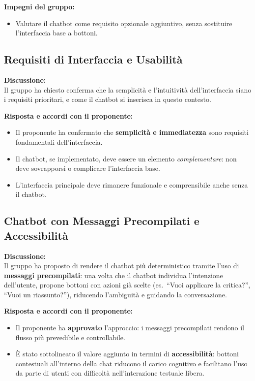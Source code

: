 \vspace{0.1cm}
\textbf{Impegni del gruppo:}
\begin{itemize}[leftmargin=1.5em, itemsep=3pt]
    \item Valutare il chatbot come requisito opzionale aggiuntivo, senza sostituire l'interfaccia base a bottoni.
\end{itemize}

\vspace{0.4cm}

\subsection{Requisiti di Interfaccia e Usabilità}

\textbf{Discussione:}\\
Il gruppo ha chiesto conferma che la semplicità e l'intuitività dell'interfaccia siano i requisiti prioritari, e come il chatbot si inserisca in questo contesto.

\vspace{0.3cm}
\textbf{Risposta e accordi con il proponente:}
\begin{itemize}[leftmargin=1.5em, itemsep=3pt]
    \item Il proponente ha confermato che \textbf{semplicità e immediatezza} sono requisiti fondamentali dell'interfaccia.
    \item Il chatbot, se implementato, deve essere un elemento \textit{complementare}: non deve sovrapporsi o complicare l'interfaccia base.
    \item L'interfaccia principale deve rimanere funzionale e comprensibile anche senza il chatbot.
\end{itemize}

\vspace{0.4cm}

\subsection{Chatbot con Messaggi Precompilati e Accessibilità}

\textbf{Discussione:}\\
Il gruppo ha proposto di rendere il chatbot più deterministico tramite l'uso di \textbf{messaggi precompilati}: una volta che il chatbot individua l'intenzione dell'utente, propone bottoni con azioni già scelte (es.\ ``Vuoi applicare la critica?'', ``Vuoi un riassunto?''), riducendo l'ambiguità e guidando la conversazione.

\vspace{0.3cm}
\textbf{Risposta e accordi con il proponente:}
\begin{itemize}[leftmargin=1.5em, itemsep=3pt]
    \item Il proponente ha \textbf{approvato} l'approccio: i messaggi precompilati rendono il flusso più prevedibile e controllabile.
    \item È stato sottolineato il valore aggiunto in termini di \textbf{accessibilità}: bottoni contestuali all'interno della chat riducono il carico cognitivo e facilitano l'uso da parte di utenti con difficoltà nell'interazione testuale libera.
\end{itemize}

